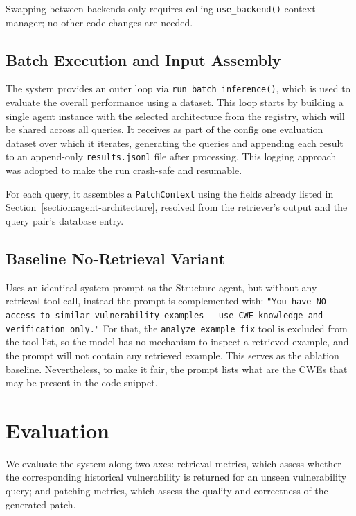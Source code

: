 Swapping between backends only requires calling \texttt{use\_backend()} context manager; no other code changes are needed.

\subsection{Batch Execution and Input Assembly}

The system provides an outer loop via \texttt{run\_batch\_inference()}, which is used to evaluate the overall performance using a dataset. 
This loop starts by building a single agent instance with the selected architecture from the registry, which will be shared across all queries. It receives as part of the config one evaluation dataset over which it iterates, generating the queries and appending each result to an append-only \texttt{results.jsonl} file after processing. This logging approach was adopted to make the run crash-safe and resumable.

For each query, it assembles a \texttt{PatchContext} using the fields already listed in Section~\ref{section:agent-architecture}, resolved from the retriever's output and the query pair's database entry.

\subsection{Baseline No-Retrieval Variant}
Uses an identical system prompt as the Structure agent, but without any retrieval tool call, instead the prompt is complemented with: \texttt{"You have NO access to similar vulnerability examples — use CWE knowledge and verification only."} 
For that, the \texttt{analyze\_example\_fix} tool is excluded from the tool list, so the model has no mechanism to inspect a retrieved example, and the prompt will not contain any retrieved example. This serves as the ablation baseline. Nevertheless, to make it fair, the prompt lists what are the CWEs that may be present in the code snippet.

\section{Evaluation}\label{section:evaluation}
We evaluate the system along two axes: retrieval metrics, which assess whether the corresponding historical vulnerability is returned for an unseen vulnerability query; and patching metrics, which assess the quality and correctness of the generated patch.


